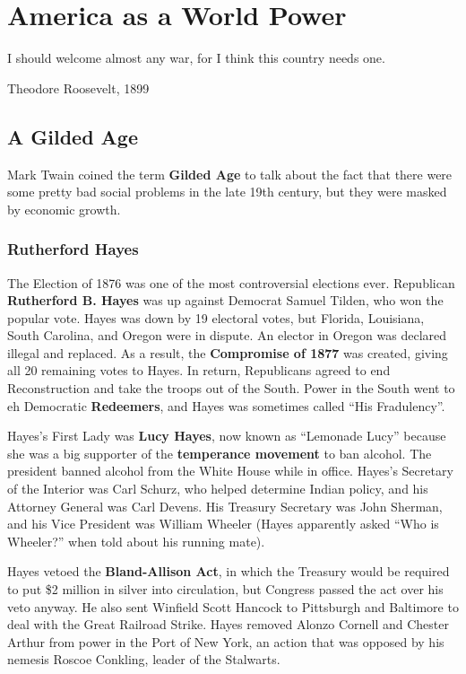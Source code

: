 \chapter{America as a World Power}

\epigraph{%
  I should welcome almost any war, for I think this country needs one.
}{Theodore Roosevelt, 1899}

\section{A Gilded Age}

Mark Twain coined the term \textbf{Gilded Age} to talk about the fact that there were some pretty bad social problems
in the late 19th century, but they were masked by economic growth.

\subsection*{Rutherford Hayes}

The Election of 1876 was one of the most controversial elections ever.
Republican \textbf{Rutherford B. Hayes} was up against Democrat Samuel Tilden, who won the popular vote.
Hayes was down by 19 electoral votes, but Florida, Louisiana, South Carolina, and Oregon were in dispute.
An elector in Oregon was declared illegal and replaced.
As a result, the \textbf{Compromise of 1877} was created, giving all 20 remaining votes to Hayes.
In return, Republicans agreed to end Reconstruction and take the troops out of the South.
Power in the South went to eh Democratic \textbf{Redeemers},
and Hayes was sometimes called ``His Fradulency''.

Hayes's First Lady was \textbf{Lucy Hayes},
now known as ``Lemonade Lucy'' because she was a big supporter of the \textbf{temperance movement} to ban alcohol.
The president banned alcohol from the White House while in office.
Hayes's Secretary of the Interior was Carl Schurz, who helped determine Indian policy,
and his Attorney General was Carl Devens.
His Treasury Secretary was John Sherman,
and his Vice President was William Wheeler
(Hayes apparently asked ``Who is Wheeler?'' when told about his running mate).

Hayes vetoed the \textbf{Bland-Allison Act},
in which the Treasury would be required to put \$2 million in silver into circulation,
but Congress passed the act over his veto anyway.
He also sent Winfield Scott Hancock to Pittsburgh and Baltimore to deal with the Great Railroad Strike.
Hayes removed Alonzo Cornell and Chester Arthur from power in the Port of New York,
an action that was opposed by his nemesis Roscoe Conkling, leader of the Stalwarts.

